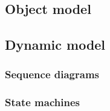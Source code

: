 \subsection{Object model}



\subsection{Dynamic model}



\subsubsection{Sequence diagrams}



\subsubsection{State machines}



\newpage
